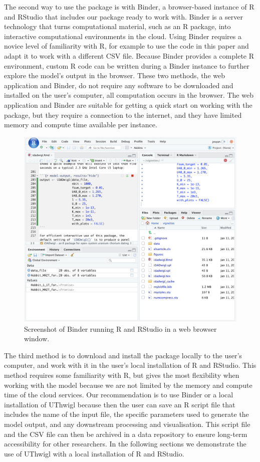 \documentclass[]{elsarticle} %
\begin{document}
The second way to use the package is with Binder, a browser-based instance of R and RStudio that includes our package ready to work with. Binder is a server technology that turns computational material, such as an R package, into interactive computational environments in the cloud. Using Binder requires a novice level of familiarity with R, for example to use the code in this paper and adapt it to work with a different CSV file. Because Binder provides a complete R environment, custom R code can be written during a Binder instance to further explore the model's output in the browser. These two methods, the web application and Binder, do not require any software to be downloaded and installed on the user's computer, all computation occurs in the browser. The web application and Binder are suitable for getting a quick start on working with the package, but they require a connection to the internet, and they have limited memory and compute time available per instance.



\begin{figure}
\includegraphics[width=0.95\linewidth]{figures/binder} \caption{Screenshot of Binder running R and RStudio in a web browser window.}\label{fig:binderfig}
\end{figure}

The third method is to download and install the package locally to the user's computer, and work with it in the user's local installation of R and RStudio. This method requires some familiarity with R, but gives the most flexibility when working with the model because we are not limited by the memory and compute time of the cloud services. Our recommendation is to use Binder or a local installation of UThwigl because then the user can save an R script file that includes the name of the input file, the specific parameters used to generate the model output, and any downstream processing and visualisation. This script file and the CSV file can then be archived in a data repository to ensure long-term accessibility for other researchers. In the following sections we demonstrate the use of UThwigl with a local installation of R and RStudio.
\end{document}
